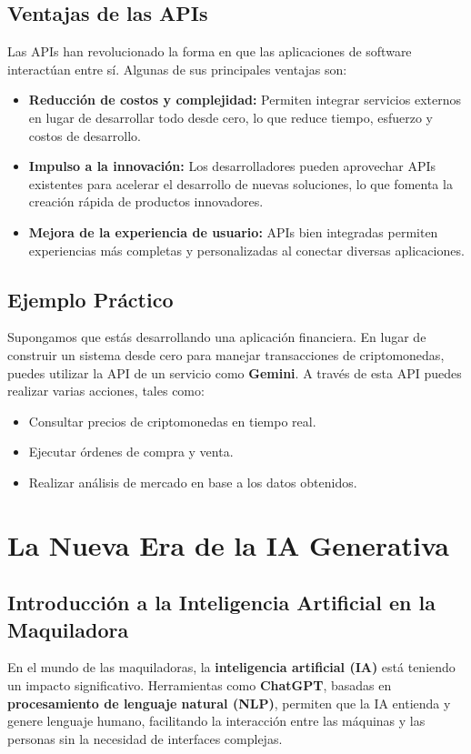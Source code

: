 \subsection{Ventajas de las APIs}
Las APIs han revolucionado la forma en que las aplicaciones de software interactúan entre sí. Algunas de sus principales ventajas son:

\begin{itemize}
    \item \textbf{Reducción de costos y complejidad:} Permiten integrar servicios externos en lugar de desarrollar todo desde cero, lo que reduce tiempo, esfuerzo y costos de desarrollo.
    \item \textbf{Impulso a la innovación:} Los desarrolladores pueden aprovechar APIs existentes para acelerar el desarrollo de nuevas soluciones, lo que fomenta la creación rápida de productos innovadores.
    \item \textbf{Mejora de la experiencia de usuario:} APIs bien integradas permiten experiencias más completas y personalizadas al conectar diversas aplicaciones.
\end{itemize}

\subsection{Ejemplo Práctico}
Supongamos que estás desarrollando una aplicación financiera. En lugar de construir un sistema desde cero para manejar transacciones de criptomonedas, puedes utilizar la API de un servicio como \textbf{Gemini}. A través de esta API puedes realizar varias acciones, tales como:

\begin{itemize}
    \item Consultar precios de criptomonedas en tiempo real.
    \item Ejecutar órdenes de compra y venta.
    \item Realizar análisis de mercado en base a los datos obtenidos.
\end{itemize}

\section{La Nueva Era de la IA Generativa}\label{la-nueva-era-ia-generativa}

\subsection{Introducción a la Inteligencia Artificial en la Maquiladora}
En el mundo de las maquiladoras, la \textbf{inteligencia artificial (IA)} está teniendo un impacto significativo. Herramientas como \textbf{ChatGPT}, basadas en \textbf{procesamiento de lenguaje natural (NLP)}, permiten que la IA entienda y genere lenguaje humano, facilitando la interacción entre las máquinas y las personas sin la necesidad de interfaces complejas.

